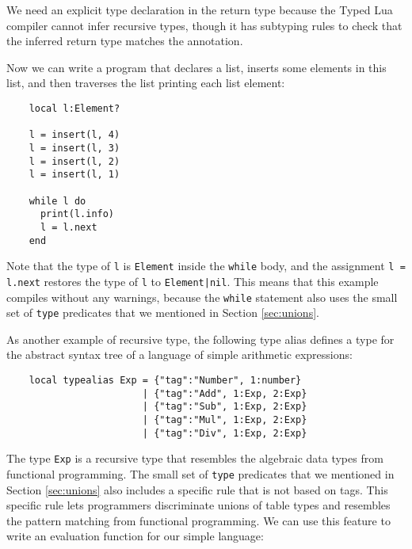 We need an explicit type declaration in the return type because
the Typed Lua compiler cannot infer recursive types, though
it has subtyping rules to check that the inferred return type
matches the annotation.

Now we can write a program that declares a list, inserts some
elements in this list, and then traverses the list printing
each list element:
\begin{verbatim}
    local l:Element?

    l = insert(l, 4)
    l = insert(l, 3)
    l = insert(l, 2)
    l = insert(l, 1)

    while l do
      print(l.info)
      l = l.next
    end
\end{verbatim}

Note that the type of \texttt{l} is \texttt{Element} inside
the \texttt{while} body, and the assignment \texttt{l = l.next}
restores the type of \texttt{l} to \texttt{Element|nil}.
This means that this example compiles without any warnings, because the
\texttt{while} statement also uses the small set of \texttt{type}
predicates that we mentioned in Section \ref{sec:unions}.

As another example of recursive type, the following type alias
defines a type for the abstract syntax tree of a language of simple
arithmetic expressions:
\begin{verbatim}
    local typealias Exp = {"tag":"Number", 1:number}
                        | {"tag":"Add", 1:Exp, 2:Exp}
                        | {"tag":"Sub", 1:Exp, 2:Exp}
                        | {"tag":"Mul", 1:Exp, 2:Exp}
                        | {"tag":"Div", 1:Exp, 2:Exp}
\end{verbatim}

The type \texttt{Exp} is a recursive type that resembles the
algebraic data types from functional programming.
The small set of \texttt{type} predicates that we mentioned
in Section \ref{sec:unions} also includes a specific rule
that is not based on tags.
This specific rule lets programmers discriminate unions of table types
and resembles the pattern matching from functional programming.
We can use this feature to write an evaluation function for
our simple language:
\begin{verbatim}
    local function eval (e:Exp):number
      if e.tag == "Number" then return e[1]
      elseif e.tag == "Add" then return eval(e[1]) + eval(e[2])
      elseif e.tag == "Sub" then return eval(e[1]) - eval(e[2])
      elseif e.tag == "Mul" then return eval(e[1]) * eval(e[2])
      elseif e.tag == "Div" then return eval(e[1]) / eval(e[2])
      end
    end
\end{verbatim}

